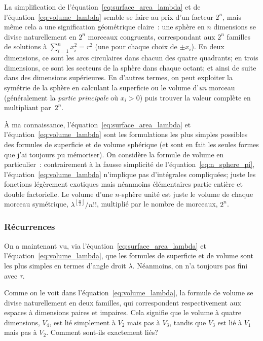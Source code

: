 La simplification de l'équation~\eqref{eq:surface_area_lambda} et de
l'équation~\eqref{eq:volume_lambda} semble se faire au prix d'un facteur $2^n$,
mais même cela a une signification géométrique claire~: une sphère en $n$
dimensions se divise naturellement en $2^n$ morceaux congruents, correspondant
aux $2^n$ familles de solutions à $\sum_{i=1}^{n} x_i^2 = r^2$ (une pour chaque
choix de $\pm x_i$). En deux dimensions, ce sont les arcs circulaires dans
chacun des quatre quadrants\ns; en trois dimensions, ce sont les secteurs de la
sphère dans chaque octant\ns; et ainsi de suite dans des dimensions supérieures.
En d'autres termes, on peut exploiter la symétrie de la sphère en calculant la
superficie ou le volume d'\emph{un} morceau (généralement la \emph{partie
principale} où $x_i > 0$) puis trouver la valeur complète en multipliant
par~$2^n$.

À ma connaissance, l'équation~\eqref{eq:surface_area_lambda} et
l'équation~\eqref{eq:volume_lambda} sont les formulations les plus simples
possibles des formules de superficie et de volume sphérique (et sont en fait les
seules formes que j'ai toujours pu mémoriser). On considère la formule de volume
en particulier~: contrairement à la fausse simplicité de
l'équation~\eqref{eq:n_sphere_pi}, l'équation~\eqref{eq:volume_lambda}
n'implique pas d'intégrales compliquées\ns; juste les fonctions légèrement
exotiques mais néanmoins élémentaires partie entière et double factorielle. Le
volume d'une $n$-sphère unité est juste le volume de chaque morceau symétrique,
$\lambda^{\left\lfloor \frac{n}{2} \right\rfloor}/n!!$, multiplié par le nombre
de morceaux, $2^n$.


\subsubsection{Récurrences} %
\label{sec:recurrences}

On a maintenant vu, via l'équation~\eqref{eq:surface_area_lambda} et
l'équation~\eqref{eq:volume_lambda}, que les formules de superficie et de volume
sont les plus simples en termes d'angle droit $\lambda$. Néanmoins, on n'a
toujours pas fini avec $\tau$.

Comme on le voit dans l'équation~\eqref{eq:volume_lambda}, la formule de volume
se divise naturellement en deux familles, qui correspondent respectivement aux
espaces à dimensions paires et impaires. Cela signifie que le volume à quatre
dimensions, $V_4$, est lié simplement à $V_2$ mais pas à $V_3$, tandis que $V_3$
est lié à $V_1$ mais pas à $V_2$. Comment sont-ils exactement liés\ns?

